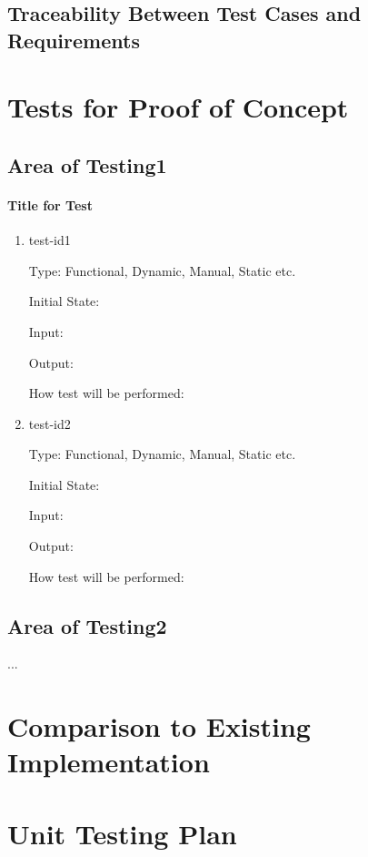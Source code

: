 \documentclass[12pt, titlepage]{article}
\begin{document}
\subsection{Traceability Between Test Cases and Requirements}

\section{Tests for Proof of Concept}

\subsection{Area of Testing1}

\paragraph{Title for Test}

\begin{enumerate}

\item{test-id1\\}

Type: Functional, Dynamic, Manual, Static etc.

Initial State:

Input:

Output:

How test will be performed:

\item{test-id2\\}

Type: Functional, Dynamic, Manual, Static etc.

Initial State:

Input:

Output:

How test will be performed:

\end{enumerate}

\subsection{Area of Testing2}

...


\section{Comparison to Existing Implementation}

\section{Unit Testing Plan}
\end{document}
